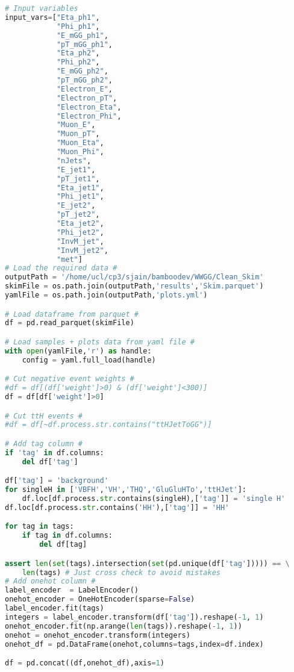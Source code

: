 \begin{lstlisting}[language=Python, caption=Python module of the analysis used in Bamboo framework, label={dnncode}]
# Input variables
input_vars=["Eta_ph1",
            "Phi_ph1",
            "E_mGG_ph1",
            "pT_mGG_ph1",
            "Eta_ph2",
            "Phi_ph2",
            "E_mGG_ph2",
            "pT_mGG_ph2",
            "Electron_E",
            "Electron_pT",
            "Electron_Eta",
            "Electron_Phi",
            "Muon_E",
            "Muon_pT",
            "Muon_Eta",
            "Muon_Phi",
            "nJets",
            "E_jet1",
            "pT_jet1",
            "Eta_jet1",
            "Phi_jet1",
            "E_jet2",
            "pT_jet2",
            "Eta_jet2",
            "Phi_jet2",
            "InvM_jet",
            "InvM_jet2",
            "met"]
# Load the required data #
outputPath = '/home/ucl/cp3/sjain/bamboodev/WWGG/Clean_Skim'
skimFile = os.path.join(outputPath,'results','Skim.parquet')
yamlFile = os.path.join(outputPath,'plots.yml')

# Load dataframe from parquet #
df = pd.read_parquet(skimFile)

# Load samples + plots data from yaml file #
with open(yamlFile,'r') as handle:
    config = yaml.full_load(handle)

# Cut negative event weights #
#df = df[(df['weight']>0) & (df['weight']<300)]
df = df[df['weight']>0]

# Cut ttH events #
#df = df[~df.process.str.contains("ttHJetToGG")]

# Add tag column #
if 'tag' in df.columns:
    del df['tag']

df['tag'] = 'background'
for singleH in ['VBFH','VH','THQ','GluGluHTo','ttHJet']:
    df.loc[df.process.str.contains(singleH),['tag']] = 'single H'
df.loc[df.process.str.contains('HH'),['tag']] = 'HH'

for tag in tags:
    if tag in df.columns:
        del df[tag]

assert len(set(tags).intersection(set(pd.unique(df['tag'])))) == \
    len(tags) # Just cross check to avoid mistakes
# Add onehot column #
label_encoder  = LabelEncoder()                                                                                                                                                              
onehot_encoder = OneHotEncoder(sparse=False)
label_encoder.fit(tags)
integers = label_encoder.transform(df['tag']).reshape(-1, 1)
onehot_encoder.fit(np.arange(len(tags)).reshape(-1, 1))
onehot = onehot_encoder.transform(integers)
onehot_df = pd.DataFrame(onehot,columns=tags,index=df.index)

df = pd.concat((df,onehot_df),axis=1)


\end{lstlisting}
